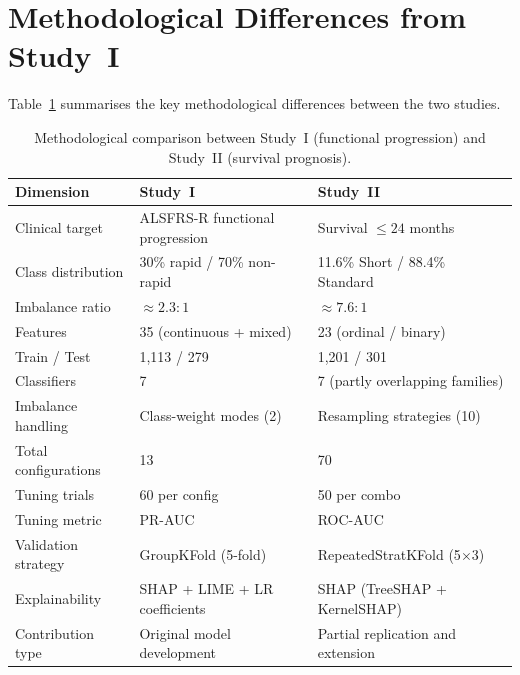 \section{Methodological Differences from Study~I}
\label{sec:s2_differences}

Table~\ref{tab:study_comparison} summarises the key methodological differences between the two studies.

\begin{table}[ht!]
\centering
\caption[Methodological comparison: Study I vs.\ Study II]{Methodological comparison between Study~I (functional progression) and Study~II (survival prognosis).}
\label{tab:study_comparison}
\small
\begin{tabular}{lll}
\toprule
\textbf{Dimension} & \textbf{Study~I} & \textbf{Study~II} \\
\midrule
Clinical target         & ALSFRS-R functional progression   & Survival $\leq 24$ months \\
Class distribution      & 30\% rapid / 70\% non-rapid       & 11.6\% Short / 88.4\% Standard \\
Imbalance ratio         & $\approx 2.3\!:\!1$              & $\approx 7.6\!:\!1$ \\
Features                & 35 (continuous + mixed)           & 23 (ordinal / binary) \\
Train / Test            & 1,113 / 279                       & 1,201 / 301 \\
Classifiers             & 7                                 & 7 (partly overlapping families) \\
Imbalance handling      & Class-weight modes (2)            & Resampling strategies (10) \\
Total configurations    & 13                                & 70 \\
Tuning trials           & 60 per config                     & 50 per combo \\
Tuning metric           & \gls{PR-AUC}                     & \gls{ROC-AUC} \\
Validation strategy     & GroupKFold (5-fold)               & RepeatedStratKFold (5$\times$3) \\
Explainability          & SHAP + LIME + LR coefficients     & SHAP (TreeSHAP + KernelSHAP) \\
Contribution type       & Original model development        & Partial replication and extension \\
\bottomrule
\end{tabular}
\end{table}

